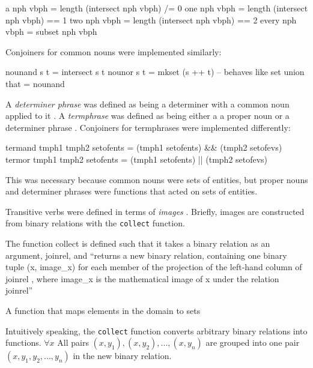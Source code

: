 \documentclass[../main.tex]{subfiles}
\begin{document}
\begin{code}
  a     nph vbph     = length (intersect nph vbph) /= 0
  one   nph vbph     = length (intersect nph vbph)  == 1
  two   nph vbph     = length (intersect nph vbph)  == 2
  every nph vbph     = subset  nph vbph
\end{code}

Conjoiners for common nouns were implemented similarly:

\begin{code}
  nounand s t  = intersect s t
  nounor  s t  = mkset (s ++ t) -- behaves like set union
  that         = nounand
\end{code}


A {\em determiner phrase} was defined as being a determiner with a common noun applied to it \cite{frost2014denotational}.
A {\em termphrase} was defined as being either a a proper noun or a determiner phrase \cite{frost2014denotational}.
Conjoiners for termphrases were implemented differently:

\begin{code}
  termand tmph1 tmph2 setofents =  (tmph1 setofents) && (tmph2 setofevs)
  termor  tmph1 tmph2 setofents =  (tmph1 setofents) || (tmph2 setofevs)
\end{code}

This was necessary because common nouns were sets of entities, but
proper nouns and determiner phrases were functions that acted on sets
of entities.

Transitive verbs were defined in terms of {\em images} \cite{frost2014denotational}.  Briefly, images
are constructed from binary relations with the \texttt{collect} function.

\begin{definition}
The function collect is defined such that it takes a binary relation as an
argument, joinrel, and ``returns a new binary relation, containing one binary tuple
(x, image\_x) for each member of the projection of the left-hand column of joinrel
, where image\_x is the mathematical image of x under the relation joinrel'' \cite{frost2014denotational}
\end{definition}

\begin{definition}[Image]
  A function that maps elements in the domain to sets
\end{definition}

Intuitively speaking, the \texttt{collect} function converts arbitrary binary
relations into functions.  $\forall x$ All pairs $(x, y_1), (x, y_2), ..., (x,
y_n)$ are grouped into one pair $(x, {y_1, y_2, ..., y_n})$ in the new binary
relation.
\end{document}
